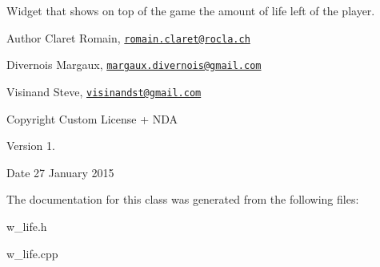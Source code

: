 Widget that shows on top of the game the amount of life left of the player. \begin{DoxyAuthor}{Author}
Claret Romain, \href{mailto:romain.claret@rocla.ch}{\tt romain.\+claret@rocla.\+ch} 

Divernois Margaux, \href{mailto:margaux.divernois@gmail.com}{\tt margaux.\+divernois@gmail.\+com} 

Visinand Steve, \href{mailto:visinandst@gmail.com}{\tt visinandst@gmail.\+com} 
\end{DoxyAuthor}
\begin{DoxyCopyright}{Copyright}
Custom License + N\+D\+A 
\end{DoxyCopyright}
\begin{DoxyVersion}{Version}
1. 
\end{DoxyVersion}
\begin{DoxyDate}{Date}
27 January 2015 
\end{DoxyDate}


The documentation for this class was generated from the following files\+:\begin{DoxyCompactItemize}
\item 
w\+\_\+life.\+h\item 
w\+\_\+life.\+cpp\end{DoxyCompactItemize}
